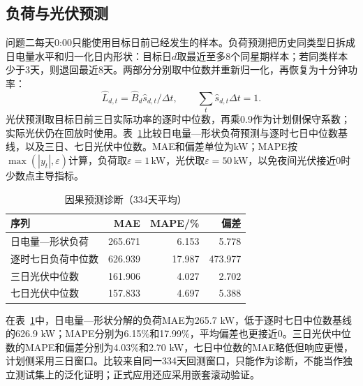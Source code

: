 \documentclass[UTF8,12pt,a4paper]{ctexart}
\begin{document}
\subsection{负荷与光伏预测}
问题二每天0:00只能使用目标日前已经发生的样本。负荷预测把历史同类型日拆成日电量水平和归一化日内形状：目标日$d$取最近至多8个同星期样本；若同类样本少于3天，则退回最近8天。两部分分别取中位数并重新归一化，再恢复为十分钟功率：
\begin{equation}\label{eq:forecast}
\hat L_{d,t}=\hat B_d\hat s_{d,t}/\Delta t,\qquad \sum_t\hat s_{d,t}\Delta t=1 .
\end{equation}
光伏预测取目标日前三日实际功率的逐时中位数，再乘0.9作为计划侧保守系数；实际光伏仍在回放时使用。表~\ref{tab:forecast}比较日电量—形状负荷预测与逐时七日中位数基线，以及三日、七日光伏中位数。MAE和偏差单位为kW；MAPE按$\max(|y_t|,\varepsilon)$计算，负荷取$\varepsilon=1$\,kW，光伏取$\varepsilon=50$\,kW，以免夜间光伏接近0时少数点主导指标。
\begin{table}[H]\centering\caption{因果预测诊断（334天平均）}\label{tab:forecast}\begin{tabular}{lrrr}\toprule 序列&MAE&MAPE/\%&偏差\\\midrule
日电量—形状负荷&265.671&6.153&5.778\\
逐时七日负荷中位数&626.939&17.987&473.977\\
三日光伏中位数&161.906&4.027&2.702\\
七日光伏中位数&157.833&4.697&5.388\\\bottomrule\end{tabular}\end{table}
在表~\ref{tab:forecast}中，日电量—形状分解的负荷MAE为265.7 kW，低于逐时七日中位数基线的626.9 kW；MAPE分别为6.15\%和17.99\%，平均偏差也更接近0。三日光伏中位数的MAPE和偏差分别为4.03\%和2.70 kW，七日中位数的MAE略低但响应更慢，计划侧采用三日窗口。比较来自同一334天回测窗口，只能作为诊断，不能当作独立测试集上的泛化证明；正式应用还应采用嵌套滚动验证。
\end{document}
